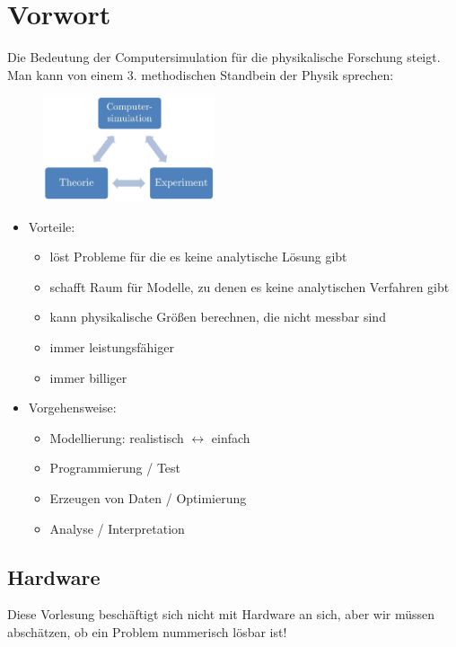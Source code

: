 \documentclass[12pt]{article}
\begin{document}
\section*{Vorwort}
Die Bedeutung der Computersimulation für die physikalische Forschung steigt. Man kann von einem 3. methodischen Standbein der Physik sprechen: 
\begin{figure}[ht]
	\centering
  \includegraphics[width=0.45\textwidth]{Null_DrittesStandbein.jpg}
	\label{Null_DrittesStandbein}
\end{figure}
\begin{itemize}
\item Vorteile:

\begin{itemize}
\item löst Probleme für die es keine analytische Lösung gibt
\item schafft Raum für Modelle, zu denen es keine analytischen Verfahren gibt
\item kann physikalische Größen berechnen, die nicht messbar sind 
\item immer leistungsfähiger
\item immer billiger
\end{itemize}


\item Vorgehensweise:

\begin{itemize}
\item Modellierung: realistisch $\longleftrightarrow$ einfach
\item Programmierung / Test
\item Erzeugen von Daten / Optimierung
\item Analyse / Interpretation
\end{itemize}
\end{itemize}

\subsection{Hardware}
Diese Vorlesung beschäftigt sich nicht mit Hardware an sich, aber wir müssen abschätzen, ob ein Problem nummerisch lösbar ist! 
\end{document}

